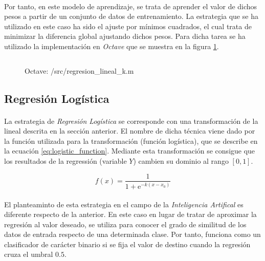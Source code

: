 \documentclass{article}
\begin{document}
			\paragraph{}
			Por tanto, en este modelo de aprendizaje, se trata de aprender el valor de dichos pesos a partir de un conjunto de datos de entrenamiento. La estrategia que se ha utilizado en este caso ha sido el ajuste por mínimos cuadrados, el cual trata de minimizar la diferencia global ajustando dichos pesos. Para dicha tarea se ha utilizado la implementación en \emph{Octave} que se muestra en la figura \ref{code:lineal_regression}.

			\begin{figure}[h]
				\centering
				\inputminted{octave}{./code/regresion_lineal_k.m}
				\caption{Octave: /src/regresion\_lineal\_k.m}
				\label{code:lineal_regression}
			\end{figure}


		\subsection{Regresión Logística}

			\paragraph{}
			La estrategia de \emph{Regresión Logística} se corresponde con una transformación de la lineal descrita en la sección anterior. El nombre de dicha técnica viene dado por la función utilizada para la transformación (función logística), que se describe en la ecuación \eqref{eq:logistic_function}. Mediante esta transformación se consigue que los resultados de la regressión (variable $Y$) cambien su dominio al rango $[0,1]$.

			\begin{equation}
			\label{eq:logistic_function}
				f(x)={\frac  {1}{1+{\mathrm  e}^{{-k(x-x_{0})}}}}
			\end{equation}

			\paragraph{}
			El planteaminto de esta estrategia en el campo de la \emph{Inteligencia Artifical} es diferente respecto de la anterior. En este caso en lugar de tratar de aproximar la regresión al valor deseado, se utiliza para conocer el grado de similitud de los datos de entrada respecto de una determinada clase. Por tanto, funciona como un clasificador de carácter binario si se fija el valor de destino cuando la regresión cruza el umbral $0.5$.
\end{document}

